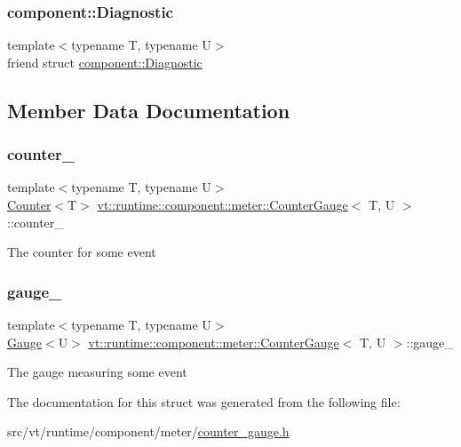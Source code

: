 \subsubsection{\texorpdfstring{component\+::\+Diagnostic}{component::Diagnostic}}
{\footnotesize\ttfamily template$<$typename T, typename U$>$ \\
friend struct \hyperlink{structvt_1_1runtime_1_1component_1_1_diagnostic}{component\+::\+Diagnostic}\hspace{0.3cm}{\ttfamily [friend]}}



\subsection{Member Data Documentation}
\mbox{\label{structvt_1_1runtime_1_1component_1_1meter_1_1_counter_gauge_a633dac04bd7b420a158ce12e36afb320}} 
\subsubsection{\texorpdfstring{counter\+\_\+}{counter\_}}
{\footnotesize\ttfamily template$<$typename T, typename U$>$ \\
\hyperlink{structvt_1_1runtime_1_1component_1_1meter_1_1_counter}{Counter}$<$T$>$ \hyperlink{structvt_1_1runtime_1_1component_1_1meter_1_1_counter_gauge}{vt\+::runtime\+::component\+::meter\+::\+Counter\+Gauge}$<$ T, U $>$\+::counter\+\_\+\hspace{0.3cm}{\ttfamily [private]}}

The counter for some event \mbox{\label{structvt_1_1runtime_1_1component_1_1meter_1_1_counter_gauge_a76c78392b6cc713038031300eb00e86c}} 
\subsubsection{\texorpdfstring{gauge\+\_\+}{gauge\_}}
{\footnotesize\ttfamily template$<$typename T, typename U$>$ \\
\hyperlink{structvt_1_1runtime_1_1component_1_1meter_1_1_gauge}{Gauge}$<$U$>$ \hyperlink{structvt_1_1runtime_1_1component_1_1meter_1_1_counter_gauge}{vt\+::runtime\+::component\+::meter\+::\+Counter\+Gauge}$<$ T, U $>$\+::gauge\+\_\+\hspace{0.3cm}{\ttfamily [private]}}

The gauge measuring some event 

The documentation for this struct was generated from the following file\+:\begin{DoxyCompactItemize}
\item 
src/vt/runtime/component/meter/\hyperlink{counter__gauge_8h}{counter\+\_\+gauge.\+h}\end{DoxyCompactItemize}
